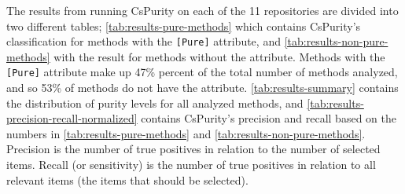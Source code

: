 \documentclass[a4paper,12pt]{article}
\begin{document}
The results from running CsPurity on each of the 11 repositories are divided into two different tables; \autoref{tab:results-pure-methods} which contains CsPurity's classification for methods with the \texttt{[Pure]} attribute, and \autoref{tab:results-non-pure-methods} with the result for methods without the attribute. Methods with the \texttt{[Pure]} attribute make up 47\% percent of the total number of methods analyzed, and so 53\% of methods do not have the attribute. \autoref{tab:results-summary} contains the distribution of purity levels for all analyzed methods, and \autoref{tab:results-precision-recall-normalized} contains CsPurity's precision and recall based on the numbers in \autoref{tab:results-pure-methods} and \autoref{tab:results-non-pure-methods}. Precision is the number of true positives in relation to the number of selected items. Recall (or sensitivity) is the number of true positives in relation to all relevant items (the items that should be selected).

\end{document}
